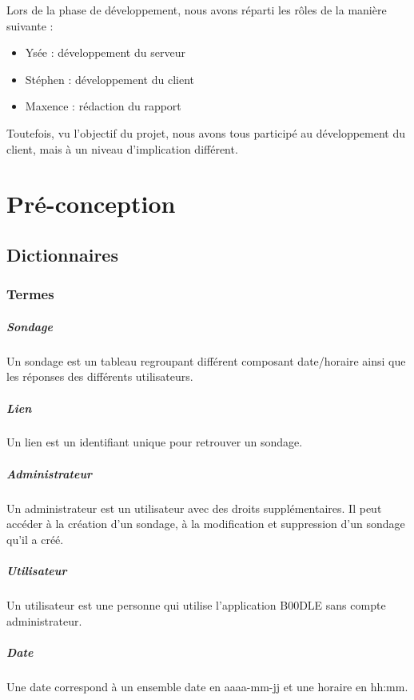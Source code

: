 \documentclass[titlepage]{report}
\begin{document}
\par Lors de la phase de développement, nous avons réparti les rôles de la manière suivante : \begin{itemize}
	\item Ysée : développement du serveur
	\item Stéphen : développement du client
	\item Maxence : rédaction du rapport
\end{itemize}
\par Toutefois, vu l'objectif du projet, nous avons tous participé au développement du client, mais à un niveau d'implication différent.


\chapter{Pré-conception}

\section{Dictionnaires}
\subsection{Termes}
\paragraph{Sondage} Un sondage est un tableau regroupant différent composant date/horaire ainsi que les réponses des différents utilisateurs.
\paragraph{Lien} Un lien est un identifiant unique pour retrouver un sondage.
\paragraph{Administrateur} Un administrateur est un utilisateur avec des droits supplémentaires. Il peut accéder à la création d’un sondage, à la modification et suppression d’un sondage qu’il a créé.
\paragraph{Utilisateur} Un utilisateur est une personne qui utilise l’application B00DLE sans compte administrateur.
\paragraph{Date} Une date correspond à un ensemble date en aaaa-mm-jj et une horaire en hh:mm.
\end{document}
